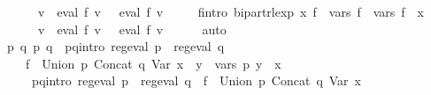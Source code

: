\begin{isabellebody}
\ \ \ \ \ \ {\isacharparenleft}{\kern0pt}{\isasymforall}v{\isachardot}{\kern0pt}\ {\isasymPsi}\ {\isacharparenleft}{\kern0pt}eval\ f{}\ v{\isacharparenright}{\kern0pt}\ {\isacharequal}{\kern0pt}\ {\isasymPsi}\ {\isacharparenleft}{\kern0pt}eval\ f{}{\isacharprime}{\kern0pt}\ v{\isacharparenright}{\kern0pt}{\isacharparenright}{\kern0pt}{\isachardoublequoteclose}\isanewline
\ \ \ \ \ f{}{\isacharprime}{\kern0pt}{\isacharunderscore}{\kern0pt}intro{\isacharcolon}{\kern0pt}\ {\isachardoublequoteopen}bipart{\isacharunderscore}{\kern0pt}rlexp\ x\ f{}{\isacharprime}{\kern0pt}\ {\isasymand}\ vars\ f{}{\isacharprime}{\kern0pt}\ {\isacharequal}{\kern0pt}\ vars\ f{}\ {\isasymunion}\ {\isacharbraceleft}{\kern0pt}x{\isacharbraceright}{\kern0pt}\ {\isasymand}\isanewline
\ \ \ \ \ \ {\isacharparenleft}{\kern0pt}{\isasymforall}v{\isachardot}{\kern0pt}\ {\isasymPsi}\ {\isacharparenleft}{\kern0pt}eval\ f{}\ v{\isacharparenright}{\kern0pt}\ {\isacharequal}{\kern0pt}\ {\isasymPsi}\ {\isacharparenleft}{\kern0pt}eval\ f{}{\isacharprime}{\kern0pt}\ v{\isacharparenright}{\kern0pt}{\isacharparenright}{\kern0pt}{\isachardoublequoteclose}\isanewline
\ \ \ \ \isamarkupfalse%
\ auto\isanewline
\ \ \isamarkupfalse%
\ \isamarkupfalse%
\ p{}\ q{}\ p{}\ q{}\ \ p{}{\isacharunderscore}{\kern0pt}q{}{\isacharunderscore}{\kern0pt}intro{\isacharcolon}{\kern0pt}\ {\isachardoublequoteopen}reg{\isacharunderscore}{\kern0pt}eval\ p{}\ {\isasymand}\ reg{\isacharunderscore}{\kern0pt}eval\ q{}\ {\isasymand}\isanewline
\ \ \ \ f{}{\isacharprime}{\kern0pt}\ {\isacharequal}{\kern0pt}\ Union\ p{}\ {\isacharparenleft}{\kern0pt}Concat\ q{}\ {\isacharparenleft}{\kern0pt}Var\ x{\isacharparenright}{\kern0pt}{\isacharparenright}{\kern0pt}\ {\isasymand}\ {\isacharparenleft}{\kern0pt}{\isasymforall}y\ {\isasymin}\ vars\ p{}{\isachardot}{\kern0pt}\ y\ {\isasymnoteq}\ x{\isacharparenright}{\kern0pt}{\isachardoublequoteclose}\isanewline
\ \ \ \ \ p{}{\isacharunderscore}{\kern0pt}q{}{\isacharunderscore}{\kern0pt}intro{\isacharcolon}{\kern0pt}\ {\isachardoublequoteopen}reg{\isacharunderscore}{\kern0pt}eval\ p{}\ {\isasymand}\ reg{\isacharunderscore}{\kern0pt}eval\ q{}\ {\isasymand}\ f{}{\isacharprime}{\kern0pt}\ {\isacharequal}{\kern0pt}\ Union\ p{}\ {\isacharparenleft}{\kern0pt}Concat\ q{}\ {\isacharparenleft}{\kern0pt}Var\ x{\isacharparenright}{\kern0pt}{\isacharparenright}{\kern0pt}\ {\isasymand}\isanewline

\end{isabellebody}
